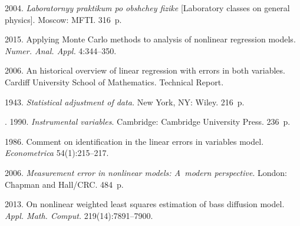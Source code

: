   






  \begin{multicols}{2}

\renewcommand{\bibname}{\protect\rmfamily References}

{\small\frenchspacing
 {%
 \begin{thebibliography}{99}

 2004. \textit{Laboratornyy praktikum po obshchey fizike} 
[Laboratory classes on general  physics].
Moscow: MFTI. 316~p.

 2015. {Applying
    Monte Carlo methods to analysis of nonlinear regression
    models}.
\textit{Numer. Anal. \mbox{Appl.}} 4:344--350.

 2006.  
{An historical overview of linear regression with errors in both variables}.
Cardiff University School of Mathematics. Technical Report.

 1943. \textit{Statistical adjustment of data.}
New York, NY: Wiley. 216~p.

.
 1990. \textit{Instrumental variables}.
Cambridge: Cambridge University Press. 236~p.

 1986. Comment on
  identification in the linear errors in variables model.
\textit{Econometrica} 54(1):215--217.

 2006.
\textit{Measurement error in nonlinear models: A~modern perspective}.
London: Chapman and Hall/CRC. 484~p.

 2013.
On nonlinear weighted least squares
  estimation of bass diffusion model.
\textit{Appl. Math. Comput.}  219(14):7891--7900.


\end{thebibliography}}}
\end{multicols}
